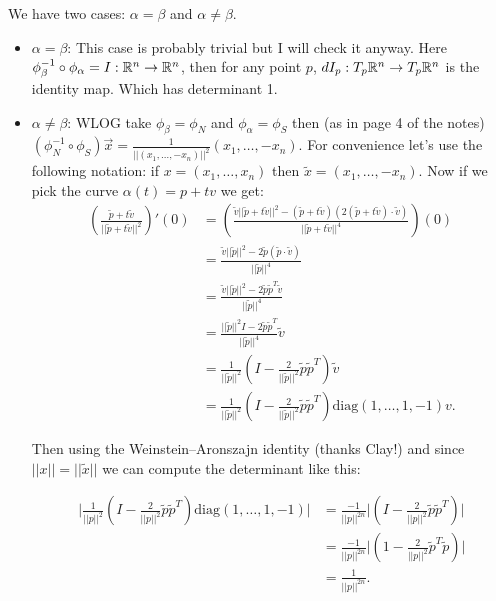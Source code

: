 \documentclass{article}
\begin{document}
We have two cases: $\alpha=\beta$ and $\alpha\neq\beta$.
\begin{itemize}
	\item $\alpha=\beta$: This case is probably
		trivial but I will check it anyway.
		Here
		$\phi_\beta^{-1}\circ\phi_\alpha=I:\mathbb{R}^n\to\mathbb{R}^n$,
		then for any point $p$,
		$dI_p:T_p\mathbb{R}^n\to T_p\mathbb{R}^n$ is the
		identity map. Which has determinant
		1.

	\item $\alpha\neq\beta$: WLOG take $\phi_\beta=\phi_N$ and
		$\phi_\alpha=\phi_S$ then (as in page 4 of the notes)
		$(\phi_N^{-1}\circ\phi_S)\vec{x}=\frac{1}{||(x_1,\dots,-x_n)||^2}(x_1,\dots,-x_n)$.
		For convenience let's use the following notation:
		if $x=(x_1,\dots,x_n)$ then $\tilde{x}=(x_1,\dots,-x_n)$. Now if we
		pick the curve $\alpha(t)=p+tv$ we get:
		\begin{align*}
			\left(\frac{\tilde{p}+t\tilde{v}}{||\tilde{p}+t\tilde{v}||^2}\right)'(0)
			&=\left(\frac{\tilde{v}||\tilde{p}+t\tilde{v}||^2-(\tilde{p}+t\tilde{v})\left(2(\tilde{p}+t\tilde{v})\cdot
			\tilde{v}\right)}{||\tilde{p}+t\tilde{v}||^4}\right)(0)\\
			&=\frac{\tilde{v}||\tilde{p}||^2-2\tilde{p}(\tilde{p}\cdot \tilde{v})}{||\tilde{p}||^4}\\
			&=\frac{\tilde{v}||\tilde{p}||^2-2\tilde{p}\tilde{p}^T\tilde{v}}{||\tilde{p}||^4}\\
			&=\frac{||\tilde{p}||^2I-2\tilde{p}\tilde{p}^T}{||\tilde{p}||^4}\tilde{v}\\
			&=\frac{1}{||\tilde{p}||^2}\left(I-\frac{2}{||\tilde{p}||^2}\tilde{p}\tilde{p}^T\right)\tilde{v}\\
			&=\frac{1}{||\tilde{p}||^2}\left(I-\frac{2}{||\tilde{p}||^2}\tilde{p}\tilde{p}^T\right)\text{diag}(1,\dots,1,-1)v.
		\end{align*}

		Then using the Weinstein–Aronszajn identity (thanks Clay!) and
		since $||x||=||\tilde{x}||$ we can compute the determinant like
		this:

		\begin{align*}
			\bigg|\frac{1}{||p||^2}\left(I-\frac{2}{||p||^2}\tilde{p}\tilde{p}^T\right)\text{diag}(1,\dots,1,-1)\bigg|
&= \frac{-1}{||p||^{2n}}\bigg|\left(I-\frac{2}{||p||^2}\tilde{p}\tilde{p}^T\right)\bigg|\\
&=\frac{-1}{||p||^{2n}}\bigg|\left(1-\frac{2}{||p||^2}\tilde{p}^T\tilde{p}\right)\bigg|\\
&=\frac{1}{||p||^{2n}}.
		\end{align*}
\end{itemize}
\end{document}
